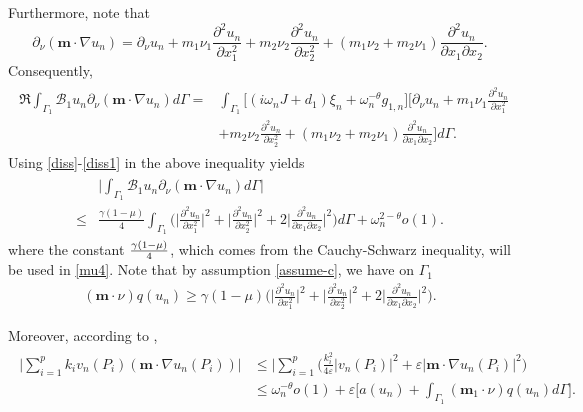 \documentclass[twoside]{article}
\theoremstyle{noparens}
\theoremstyle{definition}
\numberwithin{equation}{section}
\numberwithin{figure}{section}
\begin{document}
Furthermore, note that
$$  \partial_{\nu }(\mathbf m\cdot\nabla u_n)
= \partial_{\nu } u_n  +
m_1\nu_1{\frac{\partial^{2}u_n}{\partial x^{2}_{1}}}
+m_2\nu_2{\frac{\partial^{2}u_n}{\partial x^{2}_{2}}}   +(m_1\nu_2+m_2\nu_1)
{\frac{\partial^{2}u_n}{\partial x_{1}\partial
		x_{2}}}.
$$
Consequently,
\begin{align}
	\label{b2}
	\begin{split}
		\Re  \int_{\Gamma_{1}}\mathcal{B}_{1}u_{n} {\partial_{\nu}(\mathbf{m}\cdot\nabla u_{n})}d\Gamma
		=& \displaystyle
		\int_{\Gamma_{1}}\Big[(i\omega_n J+d_1)\xi_n +\omega_n^{-\theta} g_{1,n}\Big] \Big[\partial_{\nu}u_{n}+   m_1\nu_1{\frac{\partial^{2}u_n}{\partial x^{2}_{1}}}
		\\ & \displaystyle +m_2\nu_2{\frac{\partial^{2}u_n}{\partial x^{2}_{2}}}
		+
		(m_1\nu_2+m_2\nu_1)
		{\frac{\partial^{2}u_n}{\partial x_{1}\partial
				x_{2}}}\Big]d\Gamma.
	\end{split}
\end{align}
Using \eqref{diss}-\eqref{diss1} in the above inequality yields
\begin{align}\label{b3}
	\begin{split}
		&\Bigg|\int_{\Gamma_{1}}\mathcal{B}_{1}u_{n} {\partial_{\nu}(\mathbf{m}\cdot\nabla u_{n})}d\Gamma\bigg|\\
		\leq  & \displaystyle
		\frac{\gamma(1-\mu)}{4} \int_{\Gamma_{1}}  \bigg(\bigg|{\frac{\partial^{2}u_n}{\partial
				x^{2}_{1}}}\bigg|^2 +\bigg|{\frac{\partial^{2}u_n}{\partial
				x^{2}_{2}}}\bigg|^2 +2 \bigg|{\frac{\partial^{2}u_n}{\partial
				x_{1}\partial x_{2}}}\bigg|^2\Bigg)d\Gamma
		+ \omega_n^{2-\theta} o(1).
	\end{split}
\end{align}
where the constant ${{\gamma(1-\mu)\over4}}$, which comes from the Cauchy-Schwarz inequality, will be used in \eqref{mu4}.
Note that by assumption \eqref{assume-c}, we have on
$\Gamma_1$
\begin{align}
	\label{be4}
	(\mathbf{m}\cdot \nu)q(u_n)\ge \gamma (1-\mu) \bigg(\bigg|{\frac{\partial^{2}u_n}{\partial
			x^{2}_{1}}}\bigg|^2 +\bigg|{\frac{\partial^{2}u_n}{\partial
			x^{2}_{2}}}\bigg|^2 +2 \bigg|{\frac{\partial^{2}u_n}{\partial
			x_{1}\partial x_{2}}}\bigg|^2\bigg).
\end{align}

\noindent
Moreover, according to \cite{chen1,chen2},
\begin{align}\label{point-m}
	\begin{split}
		\Bigg|\sum_{i=1}^{p} k_iv_n(P_i)
		({\mathbf m \cdot\nabla u_n(P_i)})\Bigg|
		& \leq
		\Bigg|\sum_{i=1}^p
		\bigg( \frac{k_i^2}{4\varepsilon}|v_n(P_i)|^2 + \varepsilon |\mathbf m \cdot \nabla  u_n (P_i)|^2\bigg)\\
		& \leq   \omega_n^{-\theta }o(1)+ \varepsilon \Big[a(u_n) + \int_{\Gamma_1}(\mathbf{m}_1\cdot\nu)
		q(u_n)d\Gamma \Big].
	\end{split}
\end{align}
\end{document}
